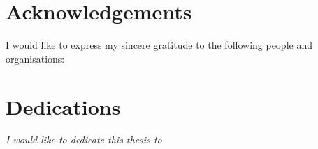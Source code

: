 \begin{abstract}[english]%

\end{abstract}


\begin{abstract}[afrikaans]%

\end{abstract}


\chapter{Acknowledgements}%

I would like to express my sincere gratitude to the following people
and organisations:



\chapter{Dedications}%
 \vfill
 \begin{center}\itshape
 	I would like to dedicate this thesis to
 \end{center}
 \vfill
 \clearpage

\endinput
